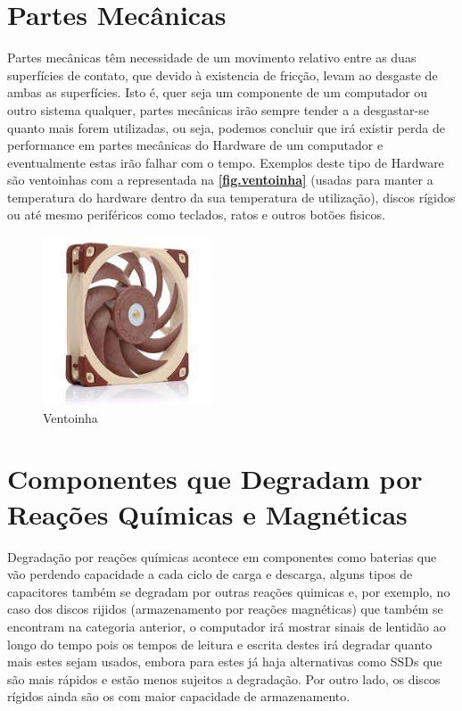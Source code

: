 \documentclass{report}
\begin{document}
\section{Partes Mecânicas}
\label{sect.Partes Mecânicas}
	Partes mecânicas têm necessidade de um movimento relativo entre as duas superfícies de contato, que devido à existencia de fricção, levam ao desgaste de ambas as superfícies. Isto é, quer seja um componente de um computador ou outro sistema qualquer, partes mecânicas irão sempre tender a a desgastar-se quanto mais forem utilizadas, ou seja, podemos concluir que irá existir perda de performance em partes mecânicas do Hardware de um computador e eventualmente estas irão falhar com o tempo. Exemplos deste tipo de Hardware são ventoinhas com a representada na \textbf{\autoref{fig.ventoinha}} (usadas para manter a temperatura do hardware dentro da sua temperatura de utilização), discos rígidos ou até mesmo periféricos como teclados, ratos e outros botões fisicos. 
\begin{figure}[h]
\center
\includegraphics[width=5cm, height=5cm]{Imagens/fan1.jpg}
\caption{Ventoinha}
\label{fig.ventoinha}
\end{figure} 
	
\section{Componentes que Degradam por Reações Químicas e Magnéticas}
\label{sect.Reações Químicas}
	Degradação por reações químicas acontece em componentes como baterias que vão perdendo capacidade a cada ciclo de carga e descarga, alguns tipos de capacitores também se degradam por outras reações quimicas e, por exemplo, no caso dos discos rijidos (armazenamento por reações magnéticas) que também se encontram na categoria anterior, o computador irá mostrar sinais de lentidão ao longo do tempo pois os tempos de leitura e escrita destes irá degradar quanto mais estes sejam usados, embora para estes já haja alternativas como \ac{SSD}s que são  mais rápidos e estão menos sujeitos a degradação. Por outro lado, os discos rígidos ainda são os com maior capacidade de armazenamento.
	
\end{document}
